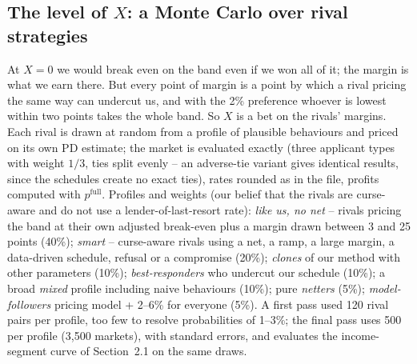 \documentclass[11pt,a4paper]{article}
\begin{document}
\subsection{The level of $X$: a Monte Carlo over rival strategies}
At $X = 0$ we would break even on the band even if we won all of it; the margin is what we earn there. But every point of
margin is a point by which a rival pricing the same way can undercut us, and with the 2\% preference whoever is lowest
within two points takes the whole band. So $X$ is a bet on the rivals' margins. Each rival is drawn at random from a
profile of plausible behaviours and priced on its own PD estimate; the market is evaluated exactly (three applicant types
with weight $1/3$, ties split evenly -- an adverse-tie variant gives identical results, since the schedules create no
exact ties), rates rounded as in the file, profits computed with $p^{\text{full}}$. Profiles and weights (our belief that
the rivals are curse-aware and do not use a lender-of-last-resort rate): \emph{like us, no net} -- rivals pricing the band
at their own adjusted break-even plus a margin drawn between 3 and 25 points (40\%); \emph{smart} -- curse-aware rivals
using a net, a ramp, a large margin, a data-driven schedule, refusal or a compromise (20\%); \emph{clones} of our method
with other parameters (10\%); \emph{best-responders} who undercut our schedule (10\%); a broad \emph{mixed} profile
including naive behaviours (10\%); pure \emph{netters} (5\%); \emph{model-followers} pricing model + 2--6\% for everyone
(5\%). A first pass used 120 rival pairs per profile, too few to resolve probabilities of 1--3\%; the final pass uses 500
per profile (3,500 markets), with standard errors, and evaluates the income-segment curve of Section~2.1 on the same draws.
\end{document}
